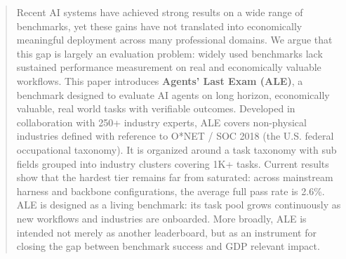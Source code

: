 \begin{abstract}
\vspace{-1em}
Recent AI systems have achieved strong results on a wide range of benchmarks, yet these gains have not translated into economically meaningful deployment across many professional domains. We argue that this gap is largely an evaluation problem: widely used benchmarks lack sustained performance measurement on real and economically valuable workflows. This paper introduces \textbf{Agents' Last Exam (ALE)}, a benchmark designed to evaluate AI agents on long horizon, economically valuable, real world tasks with verifiable outcomes. Developed in collaboration with 250+ industry experts, ALE covers non-physical industries defined with reference to O*NET / SOC 2018 (the U.S. federal occupational taxonomy). It is organized around a task taxonomy with \taskcount{} sub fields grouped into \clustercount{} industry clusters covering 1K+ tasks. Current results show that the hardest tier remains far from saturated: across mainstream harness and backbone configurations, the average full pass rate is 2.6\%. ALE is designed as a living benchmark: its task pool grows continuously as new workflows and industries are onboarded. More broadly, ALE is intended not merely as another leaderboard, but as an instrument for closing the gap between benchmark success and GDP relevant impact.
\end{abstract}
